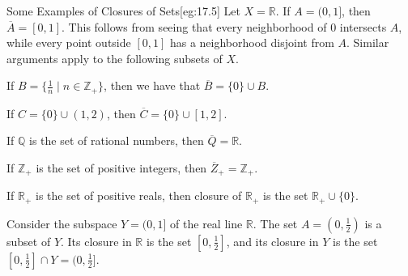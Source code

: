 \begin{egBox}{Some Examples of Closures of Sets}[eg:17.5]
    Let \( X = \mathbb{R} \). 
    If \( A = ( 0, 1 ] \), then \( \overline{ A } = [ 0, 1 ] \).
    This follows from seeing that every neighborhood of \( 0 \) intersects 
    \( A \), while every point outside \( [ 0, 1 ] \) has a neighborhood
    disjoint from \( A \). Similar arguments apply to the following subsets
    of \( X \).

    \baseRule

    If \( B = \{ \frac{ 1 }{ n } \mid n \in \mathbb{Z}_{ + } \} \), then 
    we have that \( \overline{ B } = \{ 0 \} \cup B \).
    
    \baseRule

    If \( C = \{ 0 \} \cup ( 1, 2 ) \), then \( \overline{ C } = \{ 0 \} \cup 
    [ 1, 2 ] \).

    \baseRule

    If \( \mathbb{Q} \) is the set of rational numbers, then \( \overline{ Q }
    = \mathbb{R} \).

    \baseRule

    If \( \mathbb{Z}_{ + } \) is the set of positive integers, then
    \( \overline{ Z }_{ + } = \mathbb{Z}_{ + } \).

    \baseRule

    If \( \mathbb{R}_{ + } \) is the set of positive reals, then closure of 
    \( \mathbb{R}_{ + } \) is the set \( \mathbb{R}_{ + } \cup \{ 0 \} \).

    \baseRule

    Consider the subspace \( Y = ( 0, 1 ] \) of the real line \( \mathbb{R} \).
    The set \( A = ( 0, \frac{ 1 }{ 2 } ) \) is a subset of \( Y \).
    Its closure in \( \mathbb{R} \) is the set \( [ 0, \frac{ 1 }{ 2 } ] \), and
    its closure in \( Y \) is the set \( [ 0, \frac{ 1 }{ 2 } ] \cap Y =
    ( 0, \frac{ 1 }{ 2 } ] \).
\end{egBox}

